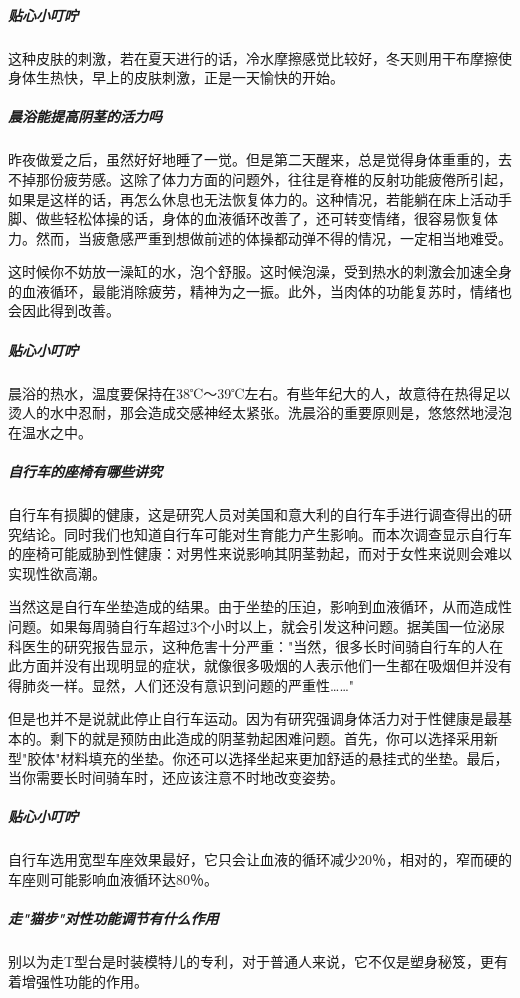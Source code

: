 \subparagraph{贴心小叮咛}

这种皮肤的刺激，若在夏天进行的话，冷水摩擦感觉比较好，冬天则用干布摩擦使身体生热快，早上的皮肤刺激，正是一天愉快的开始。

\subparagraph{晨浴能提高阴茎的活力吗}

昨夜做爱之后，虽然好好地睡了一觉。但是第二天醒来，总是觉得身体重重的，去不掉那份疲劳感。这除了体力方面的问题外，往往是脊椎的反射功能疲倦所引起，如果是这样的话，再怎么休息也无法恢复体力的。这种情况，若能躺在床上活动手脚、做些轻松体操的话，身体的血液循环改善了，还可转变情绪，很容易恢复体力。然而，当疲惫感严重到想做前述的体操都动弹不得的情况，一定相当地难受。

这时候你不妨放一澡缸的水，泡个舒服。这时候泡澡，受到热水的刺激会加速全身的血液循环，最能消除疲劳，精神为之一振。此外，当肉体的功能复苏时，情绪也会因此得到改善。

\subparagraph{贴心小叮咛}

晨浴的热水，温度要保持在38℃～39℃左右。有些年纪大的人，故意待在热得足以烫人的水中忍耐，那会造成交感神经太紧张。洗晨浴的重要原则是，悠悠然地浸泡在温水之中。

\subparagraph{自行车的座椅有哪些讲究}

自行车有损脚的健康，这是研究人员对美国和意大利的自行车手进行调查得出的研究结论。同时我们也知道自行车可能对生育能力产生影响。而本次调查显示自行车的座椅可能威胁到性健康：对男性来说影响其阴茎勃起，而对于女性来说则会难以实现性欲高潮。

当然这是自行车坐垫造成的结果。由于坐垫的压迫，影响到血液循环，从而造成性问题。如果每周骑自行车超过3个小时以上，就会引发这种问题。据美国一位泌尿科医生的研究报告显示，这种危害十分严重："当然，很多长时间骑自行车的人在此方面并没有出现明显的症状，就像很多吸烟的人表示他们一生都在吸烟但并没有得肺炎一样。显然，人们还没有意识到问题的严重性……"

但是也并不是说就此停止自行车运动。因为有研究强调身体活力对于性健康是最基本的。剩下的就是预防由此造成的阴茎勃起困难问题。首先，你可以选择采用新型"胶体"材料填充的坐垫。你还可以选择坐起来更加舒适的悬挂式的坐垫。最后，当你需要长时间骑车时，还应该注意不时地改变姿势。

\subparagraph{贴心小叮咛}

自行车选用宽型车座效果最好，它只会让血液的循环减少20％，相对的，窄而硬的车座则可能影响血液循环达80％。

\subparagraph{走"猫步"对性功能调节有什么作用}

别以为走T型台是时装模特儿的专利，对于普通人来说，它不仅是塑身秘笈，更有着增强性功能的作用。

